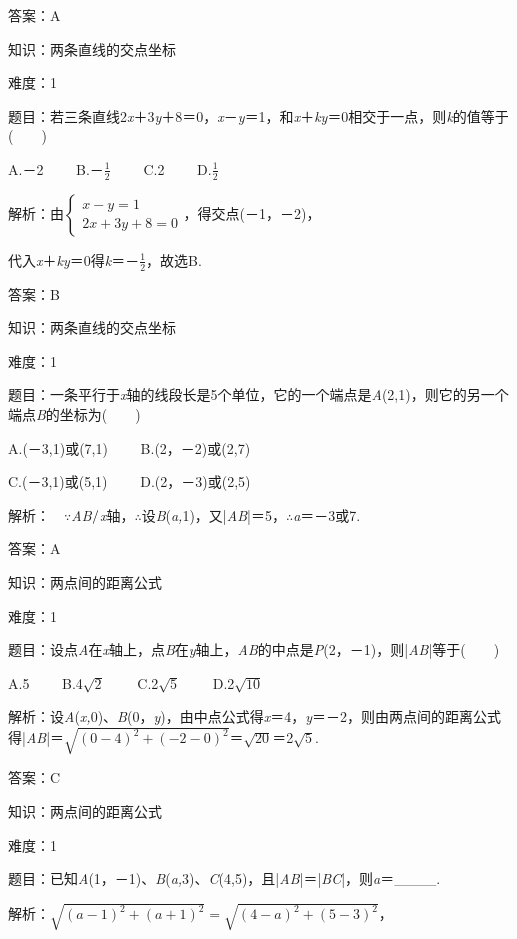 \documentclass{article} %
\begin{document}
答案：A

知识：两条直线的交点坐标

难度：1

题目：若三条直线2\textit{x}＋3\textit{y}＋8＝0，\textit{x}－\textit{y}＝1，和\textit{x}＋\textit{ky}＝0相交于一点，则\textit{k}的值等于(　　)

A.－2　　 B.－$\frac{1}{2}$　　 C.2　　 D.$\frac{1}{2}$

解析：由$\left\{\begin{array}{l} x-y=1\\ 2x+3y+8=0 \end{array}\right.$，得交点(－1，－2)，

代入\textit{x}＋\textit{ky}＝0得\textit{k}＝－$\frac{1}{2}$，故选B.

答案：B

知识：两条直线的交点坐标

难度：1

题目：一条平行于\textit{x}轴的线段长是5个单位，它的一个端点是\textit{A}(2,1)，则它的另一个端点\textit{B}的坐标为(　　)

A.(－3,1)或(7,1)　　  B.(2，－2)或(2,7)

C.(－3,1)或(5,1)　　  D.(2，－3)或(2,5)

解析：　$\mathrm{\because}$\textit{AB}$\mathrm{\//}$\textit{x}轴，$\mathrm{\therefore}$设\textit{B}(\textit{a,}1)，又|\textit{AB}|＝5，$\mathrm{\therefore}$\textit{a}＝－3或7.

答案：A

知识：两点间的距离公式

难度：1

题目：设点\textit{A}在\textit{x}轴上，点\textit{B}在\textit{y}轴上，\textit{AB}的中点是\textit{P}(2，－1)，则|\textit{AB}|等于(　　)

A.5　　 B.4$\sqrt{2}$　　 C.2$\sqrt{5}$　　 D.2$\sqrt{10}$

解析：设\textit{A}(\textit{x,}0)、\textit{B}(0，\textit{y})，由中点公式得\textit{x}＝4，\textit{y}＝－2，则由两点间的距离公式得|\textit{AB}|＝$\sqrt{(0-4)^2+(-2-0)^2}$＝$\sqrt{20}$＝2$\sqrt{5}$.

答案：C

知识：两点间的距离公式

难度：1

题目：已知\textit{A}(1，－1)、\textit{B}(\textit{a,}3)、\textit{C}(4,5)，且|\textit{AB}|＝|\textit{BC}|，则\textit{a}＝\_\_\_\_.

解析：$\sqrt{(a-1)^2+(a+1)^2}=\sqrt{(4-a)^2+(5-3)^2}$，
\end{document}
